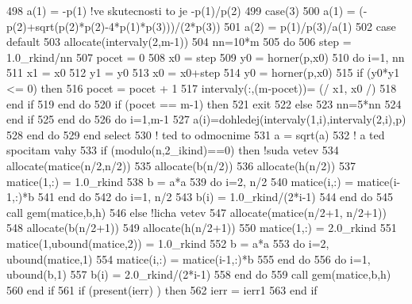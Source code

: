 \begin{DoxyCode}
498           a(1) = -p(1) \textcolor{comment}{!ve skutecnosti to je -p(1)/p(2) 
}
499         \textcolor{keywordflow}{case}(3)
500           a(1) = (-p(2)+sqrt(p(2)*p(2)-4*p(1)*p(3)))/(2*p(3))
501           a(2) = p(1)/p(3)/a(1)
502 \textcolor{keywordflow}{        case default}
503           \textcolor{keyword}{allocate}(intervaly(2,m-1))
504           nn=10*m
505           \textcolor{keywordflow}{do} 
506             step = 1.0\_rkind/nn
507             pocet = 0
508             x0 = step
509             y0 = horner(p,x0)
510             \textcolor{keywordflow}{do} i=1, nn
511               x1 = x0
512               y1 = y0
513               x0 = x0+step
514               y0 = horner(p,x0)
515               \textcolor{keywordflow}{if} (y0*y1 <= 0) then
516                 pocet = pocet + 1
517                 intervaly(:,(m-pocet))= (/ x1, x0 /)
518 \textcolor{keyword}{              end }if
519 \textcolor{keywordflow}{            end do}      
520             \textcolor{keywordflow}{if} (pocet == m-1) \textcolor{keywordflow}{then} 
521               \textcolor{keywordflow}{exit}              
522             else
523               nn=5*nn
524 \textcolor{keyword}{            end }if
525 \textcolor{keywordflow}{          end do}        
526           \textcolor{keywordflow}{do} i=1,m-1
527             a(i)=dohledej(intervaly(1,i),intervaly(2,i),p)
528 \textcolor{keyword}{          end }do
529 \textcolor{keyword}{      end }select
530       \textcolor{comment}{! ted to odmocnime
}
531       a = sqrt(a)
532       \textcolor{comment}{! a ted spocitam vahy
}
533       \textcolor{keywordflow}{if} (modulo(n,2\_ikind)==0) \textcolor{keywordflow}{then} \textcolor{comment}{!suda vetev
}
534         \textcolor{keyword}{allocate}(matice(n/2,n/2))
535         \textcolor{keyword}{allocate}(b(n/2))
536         \textcolor{keyword}{allocate}(h(n/2))
537         matice(1,:) = 1.0\_rkind
538         b = a*a
539         \textcolor{keywordflow}{do} i=2, n/2
540           matice(i,:) = matice(i-1,:)*b
541 \textcolor{keyword}{        end }do
542         \textcolor{keywordflow}{do} i=1, n/2
543           b(i) = 1.0\_rkind/(2*i-1)
544 \textcolor{keyword}{        end }do
545         \textcolor{keyword}{call }gem(matice,b,h)
546       \textcolor{keywordflow}{else}  \textcolor{comment}{!licha vetev
}
547         \textcolor{keyword}{allocate}(matice(n/2+1, n/2+1))
548         \textcolor{keyword}{allocate}(b(n/2+1))
549         \textcolor{keyword}{allocate}(h(n/2+1))
550         matice(1,:) = 2.0\_rkind
551         matice(1,ubound(matice,2)) = 1.0\_rkind
552         b = a*a
553         \textcolor{keywordflow}{do} i=2, ubound(matice,1)
554           matice(i,:) = matice(i-1,:)*b
555 \textcolor{keyword}{        end }do
556         \textcolor{keywordflow}{do} i=1, ubound(b,1)
557           b(i) = 2.0\_rkind/(2*i-1)
558 \textcolor{keyword}{        end }do
559         \textcolor{keyword}{call }gem(matice,b,h)
560 \textcolor{keyword}{      end }if
561       \textcolor{keywordflow}{if} (\textcolor{keyword}{present}(ierr) ) then
562         ierr = ierr1
563 \textcolor{keyword}{      end }if
\end{DoxyCode}


